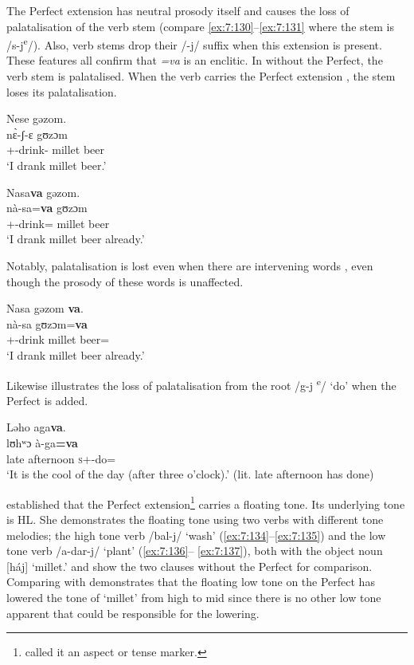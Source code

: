 The Perfect extension has neutral prosody itself and causes the loss of palatalisation of the verb stem (compare \ref{ex:7:130}--\ref{ex:7:131} where the stem is /s-j\textsuperscript{e}/).  Also, verb stems drop their /-j/ suffix when this extension is present. These features all confirm that \textit{=va} is an enclitic. In  without the Perfect, the verb stem is palatalised. When the verb carries the Perfect extension , the stem loses its palatalisation. 

\ea\label{ex:7:130}
Nese  gəzom.\\
\gll  n\`ɛ-ʃ{}-ɛ       gʊzɔm\\
      {\oneS}+{\PFV}-drink-{\CL}    {millet beer}\\
\glt  ‘I drank millet beer.’\\
\z 

\ea\label{ex:7:131}
Nasa\textbf{va} gəzom.\\
\gll  n\`a{}-sa=\textbf{va}  gʊzɔm\\
      {\oneS}+{\PFV}-drink={\PRF}  {millet beer}\\
\glt  ‘I drank millet beer already.’\\
\z 

Notably, palatalisation is lost even when there are intervening words , even though the prosody of these words is unaffected. 

\ea\label{ex:7:132}
Nasa  gəzom  \textbf{va}.\\
\gll  nà{}-sa      gʊzɔm=\textbf{va}\\
      {\oneS}+{\PFV}-drink    {millet beer}={\PRF}\\
\glt  ‘I drank millet beer already.’\\
\z 

Likewise  illustrates the loss of palatalisation from the root /g-j\textsuperscript{ e}/ ‘do’ when the Perfect is added. 

\clearpage
\ea\label{ex:7:133}
Ləho  aga\textbf{va}.\\
\gll  lʊhʷɔ    à-ga\textbf{=va}\\
      {late afternoon}  \textsc{s}+{\PFV}-do={\PRF}\\
\glt  ‘It is the cool of the day (after three o’clock).’ (lit. late afternoon has done)\\
\z  

\citet{Bow1997c} established that the Perfect extension\footnote{\citet{Bow1997c} called it an aspect or tense marker.} carries a floating tone. Its underlying tone is HL. She demonstrates the floating tone using two verbs with different tone melodies; the high tone verb /bal-j/ ‘wash’ (\ref{ex:7:134}--\ref{ex:7:135}) and the low tone verb /a-dar-j/ ‘plant’ (\ref{ex:7:136}-- \ref{ex:7:137}), both with the object noun [háj] ‘millet.’  and   show the two clauses without the Perfect for comparison. Comparing  with   demonstrates that the floating low tone on the Perfect has lowered the tone of ‘millet’ from high to mid since there is no other low tone apparent that could be responsible for the lowering.  


